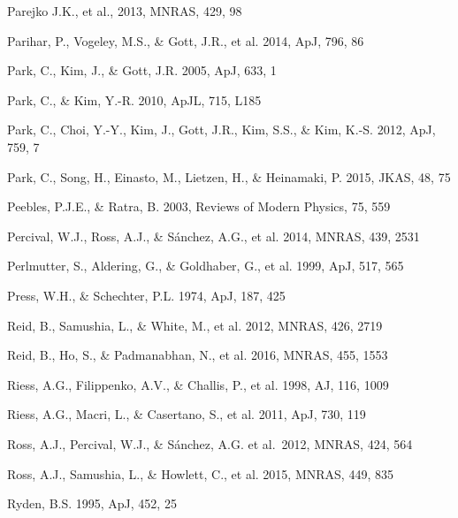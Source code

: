 \documentclass[useAMS,usenatbib]{mnras}
\begin{document}
\begin{thebibliography}{}
Parejko J.K., et al., 2013, MNRAS, 429, 98

Parihar, P., Vogeley, M.S., \& Gott, J.R., et al. 2014, ApJ, 796, 86

Park, C., Kim, J., \& Gott, J.R. 2005, ApJ, 633, 1  

Park, C., \& Kim, Y.-R. 2010, ApJL, 715, L185  

Park, C., Choi, Y.-Y., Kim, J., Gott, J.R., Kim, S.S., \&
Kim, K.-S. 2012, ApJ, 759, 7

Park, C., Song, H., Einasto, M., Lietzen, H., \&
Heinamaki, P. 2015, JKAS, 48, 75

Peebles, P.J.E., \& Ratra, B. 2003, Reviews of Modern Physics, 75, 559

Percival, W.J., Ross, A.J., \& S\'{a}nchez, A.G., et al. 2014, MNRAS, 439, 2531

Perlmutter, S., Aldering, G., \& Goldhaber, G., et al. 1999, ApJ, 517, 565  

Press, W.H., \& Schechter, P.L. 1974, ApJ, 187, 425



Reid, B., Samushia, L., \& White, M., et al. 2012, MNRAS, 426, 2719  

Reid, B., Ho, S., \& Padmanabhan, N., et al.  2016, MNRAS, 455, 1553

Riess, A.G., Filippenko, A.V., \& Challis, P., et al. 1998, AJ, 116, 1009  

Riess, A.G., Macri, L., \& Casertano, S., et al. 2011, ApJ, 730, 119

Ross, A.J., Percival, W.J., \& S{\'a}nchez, A.G. et al.\ 2012, MNRAS, 424, 564 

Ross, A.J., Samushia, L., \& Howlett, C., et al. 2015, MNRAS, 449, 835

Ryden, B.S. 1995, ApJ, 452, 25  


\end{thebibliography}
\end{document}
